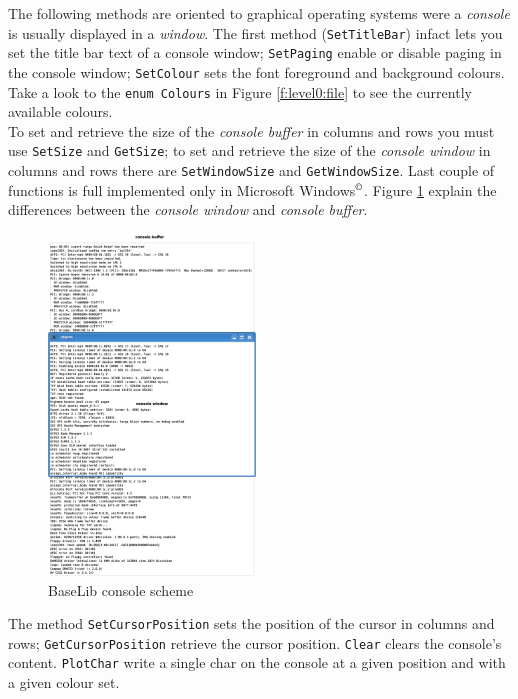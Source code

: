 The following methods are oriented to graphical operating systems were a \textit{console} is usually displayed in a \textit{window}. The first method (\texttt{SetTitleBar}) infact lets you set the title bar text of a console window; \texttt{SetPaging} enable or disable paging in the console window; \texttt{SetColour} sets the font foreground and background colours. Take a look to the \texttt{enum Colours} in Figure \ref{f:level0:file} to see the currently available colours. \\


To set and retrieve the size of the \textit{console buffer} in columns and rows you must use \texttt{SetSize} and \texttt{GetSize}; to set and retrieve the size of the \textit{console window} in columns and rows there are \texttt{SetWindowSize} and \texttt{GetWindowSize}. Last couple of functions is full implemented only in Microsoft Windows$^{\copyright}$. Figure \ref{f:level0:console} explain the differences between the \textit{console window} and \textit{console buffer}.

\begin{figure}[h!]
 \begin{center}
  \includegraphics[width=0.49\textwidth]{level0/console.eps}
  \caption{BaseLib console scheme}
  \label{f:level0:console}
 \end{center}
\end{figure}

The method \texttt{SetCursorPosition} sets the position of the cursor in columns and rows; \texttt{GetCursorPosition} retrieve the cursor position. \texttt{Clear} clears the console's content. \texttt{PlotChar} write a single char on the console at a given position and with a given colour set.

